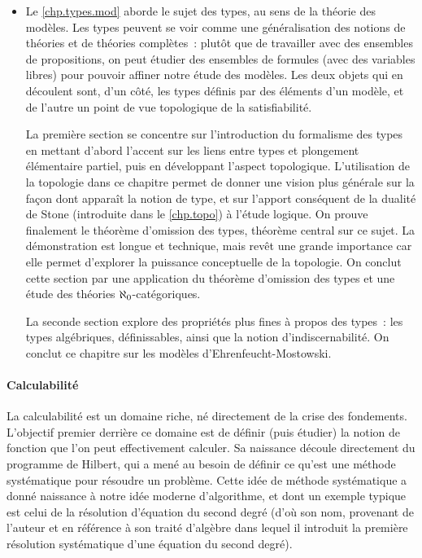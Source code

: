 \begin{itemize}
\item Le \cref{chp.types.mod} aborde le sujet des types, au sens de la théorie
  des modèles. Les types peuvent se voir comme une généralisation des notions
  de théories et de théories complètes~: plutôt que de travailler avec des
  ensembles de propositions, on peut étudier des ensembles de formules (avec
  des variables libres) pour pouvoir affiner notre étude des modèles. Les deux
  objets qui en découlent sont, d'un côté, les types définis par des éléments
  d'un modèle, et de l'autre un point de vue topologique de la satisfiabilité.

  La première section se concentre sur l'introduction du formalisme des types
  en mettant d'abord l'accent sur les liens entre types et plongement
  élémentaire partiel, puis en développant l'aspect topologique. L'utilisation
  de la topologie dans ce chapitre permet de donner une vision plus générale sur
  la façon dont apparaît la notion de type, et sur l'apport conséquent de la
  dualité de Stone (introduite dans le \cref{chp.topo}) à l'étude logique. On
  prouve finalement le théorème d'omission des types, théorème central sur ce
  sujet. La démonstration est longue et technique, mais revêt une grande
  importance car elle permet d'explorer la puissance conceptuelle de la
  topologie. On conclut cette section par une application du théorème d'omission
  des types et une étude des théories $\aleph_0$-catégoriques.

  La seconde section explore des propriétés plus fines à propos des types~: les
  types algébriques, définissables, ainsi que la notion d'indiscernabilité. On
  conclut ce chapitre sur les modèles d'Ehrenfeucht-Mostowski.
\end{itemize}

\paragraph{Calculabilité}
La calculabilité est un domaine riche, né directement de la crise des
fondements. L'objectif premier derrière ce domaine est de définir (puis étudier)
la notion de fonction que l'on peut effectivement calculer. Sa naissance découle
directement du programme de Hilbert, qui a mené au besoin de définir ce
qu'est une méthode systématique pour résoudre un problème. Cette idée de méthode
systématique a donné naissance à notre idée moderne d'algorithme, et dont un
exemple typique est celui de la résolution d'équation du second degré (d'où
son nom, provenant de l'auteur  et en référence à son traité
d'algèbre dans lequel il introduit la première résolution systématique d'une
équation du second degré).

